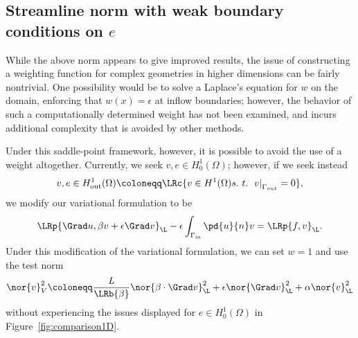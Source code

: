 \subsection{Streamline norm with weak boundary conditions on $e$}

While the above norm appears to give improved results, the issue of constructing a weighting function for complex geometries in higher dimensions can be fairly nontrivial.  One possibility would be to solve a Laplace's equation for $w$ on the domain, enforcing that $w(x) = \epsilon$ at inflow boundaries; however, the behavior of such a computationally determined weight has not been examined, and incurs additional complexity that is avoided by other methods.  

Under this saddle-point framework, however, it is possible to avoid the use of a weight altogether.  Currently, we seek $v,e\in H^1_0(\Omega)$; however, if we seek instead 
\[
v,e\in H^1_{\rm out}(\Omega) \coloneqq \LRc{v\in H^1(\Omega) s.\ t.\ \left.v\right|_{\Gamma_{out}} = 0},
\]
we modify our variational formulation to be
\[
\LRp{\Grad u,\beta v + \epsilon \Grad v}_{\L} - \epsilon\int_{\Gamma_{\rm in}} \pd{u}{n}v = \LRp{f,v}_{\L}.
\]
Under this modification of the variational formulation, we can set $w=1$ and use the test norm
\[
\nor{v}_{V}^2 \coloneqq \frac{L}{\LRb{\beta}}\nor{\beta\cdot \Grad v}_{\L}^2 + \epsilon\nor{\Grad v}_{\L}^2 + \alpha\nor{v}_{\L}^2
\]
without experiencing the issues displayed for $e\in H^1_0(\Omega)$ in Figure~\ref{fig:comparison1D}.  

